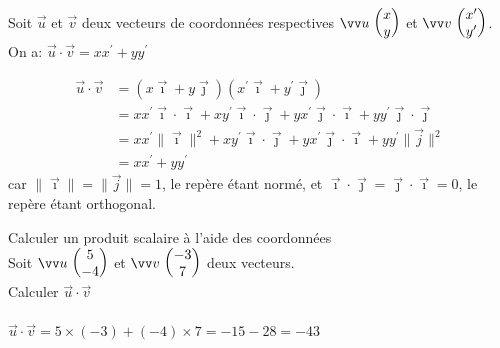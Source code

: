     \begin{propriete}
        Soit $\vec{u}$ et $\vec{v}$ deux vecteurs de coordonnées respectives $\Coord{u}{x}{y}$ et $\Coord{v}{x'}{y'}$. On a: $\vec{u} \cdot \vec{v}=x x^{\prime}+y y^{\prime}$
    \end{propriete}
    
    \begin{demonstration}
        \begin{align*}
            \vec{u} \cdot \vec{v}&=(x \vec{\imath}+y \vec{\jmath})\left(x^{\prime} \vec{\imath}+y^{\prime} \vec{\jmath}\right)\\
            &=x x^{\prime} \vec{\imath} \cdot \vec{\imath}+x y^{\prime} \vec{\imath} \cdot \vec{\jmath}+y x^{\prime} \vec{\jmath} \cdot \vec{\imath}+y y^{\prime} \vec{\jmath} \cdot \vec{\jmath}\\
            &=x x^{\prime}\|\vec{\imath}\|^{2}+x y^{\prime} \vec{\imath} \cdot \vec{\jmath}+y x^{\prime} \vec{\jmath} \cdot \vec{\imath}+y y^{\prime}\|\vec{j}\|^{2}\\
            &=x x^{\prime}+y y^{\prime}
        \end{align*}
        car $\|\vec{\imath}\|=\|\vec{j}\|=1$, le repère étant normé, et $\vec{\imath} \cdot \vec{\jmath}=\vec{\jmath} \cdot \vec{\imath}=0$, le repère étant orthogonal.
    \end{demonstration}
    
    \begin{methodeTitre}{Calculer un produit scalaire à l'aide des coordonnées}
        \\
        Soit $\Coord{u}{5}{-4}$ et $\Coord{v}{-3}{7}$ deux vecteurs.\\
        Calculer $\vec{u} \cdot \vec{v}$
        \ \\
        \\
        $\vec{u} \cdot \vec{v}=5 \times(-3)+(-4) \times 7=-15-28=-43$
    \end{methodeTitre}

